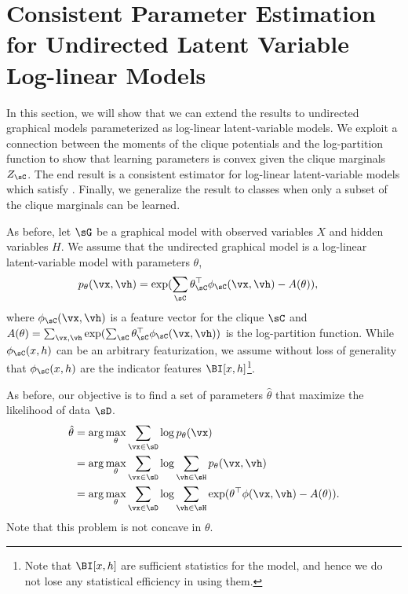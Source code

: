 \section{Consistent Parameter Estimation for Undirected Latent Variable Log-linear Models}
\label{sec:undirected}

In this section, we will show that we can extend the results to
  undirected graphical models parameterized as log-linear latent-variable
  models.
We exploit a connection between the moments of the clique potentials and
  the log-partition function to show that learning parameters is convex
  given the clique marginals $Z_\sC$. 
The end result is a consistent estimator for log-linear
  latent-variable models which satisfy .
Finally, we generalize the result to classes when only a subset of the
  clique marginals can be learned.

As before, let $\sG$ be a graphical model with observed variables $X$ and hidden variables $H$.
We assume that the undirected graphical model is a log-linear latent-variable model with parameters $\theta$,
\begin{align*}
  p_\theta(\vx, \vh) &= \exp( \sum_\sC \theta_\sC^\top \phi_\sC(\vx,\vh) - A(\theta) ),
\end{align*}
where $\phi_\sC(\vx,\vh)$ is a feature vector for the clique $\sC$ and
  $A(\theta) = \sum_{\vx, \vh}  \exp( \sum_\sC \theta_\sC^\top \phi_\sC(\vx,\vh) )$ is the
  log-partition function.
While $\phi_\sC(x,h)$ can be an arbitrary featurization, we assume
  without loss of generality that $\phi_\sC(x,h)$ are the indicator
  features $\BI[x,h]$\footnote{Note that $\BI[x,h]$ are sufficient
  statistics for the model, and hence we do not lose any statistical
  efficiency in using them.}.

As before, our objective is to find a set of parameters $\hat \theta$
  that maximize the likelihood of data $\sD$.
\begin{align}
  \hat \theta 
      &= \arg\max_{\theta} \sum_{\vx \in \sD} \log p_\theta(\vx) \nonumber \\
      &= \arg\max_{\theta} \sum_{\vx \in \sD} \log \sum_{\vh \in \sH} p_\theta(\vx,\vh) \nonumber \\
      &= \arg\max_{\theta} \sum_{\vx \in \sD} \log \sum_{\vh \in \sH} \exp( \theta^\top\phi(\vx,\vh) - A(\theta) ). \label{eqn:obj-ml}
\end{align}
Note that this problem is not concave in $\theta$. 


